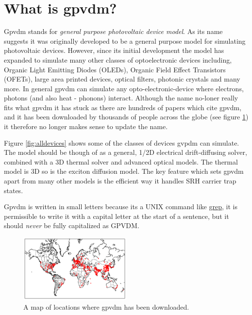 \section{What is gpvdm?} 
Gpvdm stands for \emph{general purpose photovoltaic device model}.  As its name suggests it was originally developed to be a general purpose model for simulating photovoltaic devices. However, since its initial development the model has expanded to simulate many other classes of optoelectronic devices including, Organic Light Emitting Diodes (OLEDs), Organic Field Effect Transistors (OFETs), large area printed devices, optical filters, photonic crystals and many more.  In general gpvdm can simulate any opto-electronic-device where electrons, photons (and also heat - phonons) interact.  Although the name no-loner really fits what gpvdm it has stuck as there are hundreds of papers which cite gpvdm, and it has been downloaded by thousands of people across the globe (see figure \ref{fig:downloadmap}) it therefore no longer makes sense to update the name.

Figure \ref{fig:alldevices} shows some of the classes of devices gvpdm can simulate. The model should be though of as a general, 1/2D electrical drift-diffusing solver, combined with a 3D thermal solver and advanced optical models.  The thermal model is 3D so is the exciton diffusion model.  The key feature which sets gpvdm apart from many other models is the efficient way it handles SRH carrier trap states. 

Gpvdm is written in small letters because its a UNIX command like \href{https://en.wikipedia.org/wiki/Grep}{grep}, it is permissible to write it with a capital letter at the start of a sentence, but it should \emph{never} be fully capitalized as GPVDM.



\begin{figure}
\centering
\includegraphics[width=0.5\textwidth]{./images/map.png}
\caption{A map of locations where gpvdm has been downloaded.}
\label{fig:downloadmap}
\end{figure}

